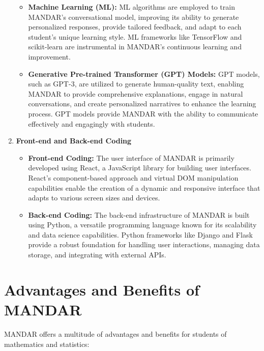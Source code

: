 \documentclass[20pt]{report}
\begin{document}
\begin{enumerate}
\begin{itemize}
\item \textbf{Machine Learning (ML):} ML algorithms are employed to train MANDAR's conversational model, improving its ability to generate personalized responses, provide tailored feedback, and adapt to each student's unique learning style. ML frameworks like TensorFlow and scikit-learn are instrumental in MANDAR's continuous learning and improvement.
\item \textbf{Generative Pre-trained Transformer (GPT) Models:} GPT models, such as GPT-3, are utilized to generate human-quality text, enabling MANDAR to provide comprehensive explanations, engage in natural conversations, and create personalized narratives to enhance the learning process. GPT models provide MANDAR with the ability to communicate effectively and engagingly with students.
\end{itemize}
\item \textbf{Front-end and Back-end Coding}
\begin{itemize}
\item \textbf{Front-end Coding:} The user interface of MANDAR is primarily developed using React, a JavaScript library for building user interfaces. React's component-based approach and virtual DOM manipulation capabilities enable the creation of a dynamic and responsive interface that adapts to various screen sizes and devices.
\item \textbf{Back-end Coding:} The back-end infrastructure of MANDAR is built using Python, a versatile programming language known for its scalability and data science capabilities. Python frameworks like Django and Flask provide a robust foundation for handling user interactions, managing data storage, and integrating with external APIs.
\end{itemize}

\end{enumerate}
\section{Advantages and Benefits of MANDAR}

MANDAR offers a multitude of advantages and benefits for students of mathematics and statistics:
\end{document}
